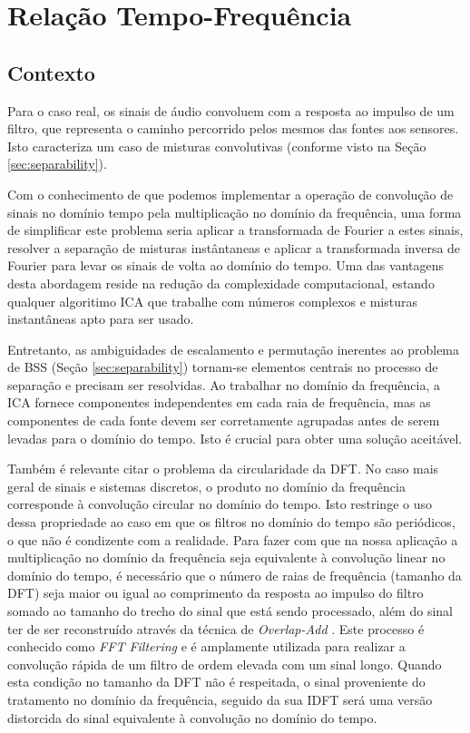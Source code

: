 \label{chap:3}

\section{Relação Tempo-Frequência}
    
    \subsection{Contexto}
        Para o caso real, os sinais de áudio convoluem com a resposta ao impulso de um filtro, que representa o caminho percorrido pelos mesmos das fontes aos sensores. Isto caracteriza um caso de misturas convolutivas (conforme visto na Seção \ref{sec:separability}). 
        
        Com o conhecimento de que podemos implementar a operação de convolução de sinais no domínio tempo pela  multiplicação no domínio da frequência, uma forma de simplificar este problema seria aplicar a transformada de Fourier a estes sinais, resolver a separação de misturas instântaneas e aplicar a transformada inversa de Fourier para levar os sinais de volta ao domínio do tempo. Uma das vantagens desta abordagem reside na redução da complexidade computacional, estando qualquer algoritimo ICA que trabalhe com números complexos e misturas instantâneas apto para ser usado.
        
        Entretanto, as ambiguidades de escalamento e permutação inerentes ao problema de BSS (Seção \ref{sec:separability}) tornam-se elementos centrais no processo de separação e precisam ser resolvidas. Ao trabalhar no domínio da frequência, a ICA fornece componentes independentes em cada raia de frequência, mas as componentes de cada fonte devem ser corretamente agrupadas antes de serem levadas para o domínio do tempo. Isto é crucial para obter uma solução aceitável.
        
        Também é relevante citar o problema da circularidade da DFT. No caso mais geral de sinais e sistemas discretos, o produto no domínio da frequência corresponde à convolução circular no domínio do tempo. Isto restringe o uso dessa propriedade ao caso em que os filtros no domínio do tempo são periódicos, o que não é condizente com a realidade. Para fazer com que na nossa aplicação a multiplicação no domínio da frequência seja equivalente à convolução linear no domínio do tempo, é necessário que o número de raias de frequência (tamanho da DFT) seja maior ou igual ao comprimento da resposta ao impulso do filtro somado ao tamanho do trecho do sinal que está sendo processado, além do sinal ter de ser reconstruído através da técnica de \textit{Overlap-Add} \cite{signalprocessing} . Este processo é conhecido como \textit{FFT Filtering} e é amplamente utilizada para realizar a convolução rápida de um filtro de ordem elevada com um sinal longo. Quando esta condição no tamanho da DFT não é respeitada, o sinal proveniente do tratamento no domínio da frequência, seguido da sua IDFT será uma versão distorcida do sinal equivalente à convolução no domínio do tempo.
        

